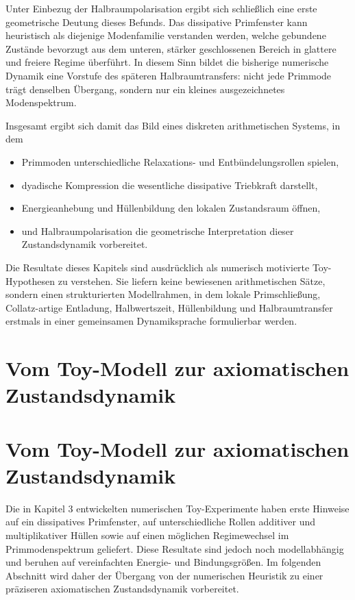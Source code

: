 \documentclass[11pt,a4paper]{article}
\theoremstyle{definition}
\begin{document}
Unter Einbezug der Halbraumpolarisation ergibt sich schließlich eine erste geometrische Deutung dieses Befunds. Das dissipative Primfenster kann heuristisch als diejenige Modenfamilie verstanden werden, welche gebundene Zustände bevorzugt aus dem unteren, stärker geschlossenen Bereich in glattere und freiere Regime überführt. In diesem Sinn bildet die bisherige numerische Dynamik eine Vorstufe des späteren Halbraumtransfers: nicht jede Primmode trägt denselben Übergang, sondern nur ein kleines ausgezeichnetes Modenspektrum.

Insgesamt ergibt sich damit das Bild eines diskreten arithmetischen Systems, in dem
\begin{itemize}
	\item Primmoden unterschiedliche Relaxations- und Entbündelungsrollen spielen,
	\item dyadische Kompression die wesentliche dissipative Triebkraft darstellt,
	\item Energieanhebung und Hüllenbildung den lokalen Zustandsraum öffnen,
	\item und Halbraumpolarisation die geometrische Interpretation dieser Zustandsdynamik vorbereitet.
\end{itemize}

Die Resultate dieses Kapitels sind ausdrücklich als numerisch motivierte Toy-Hypothesen zu verstehen. Sie liefern keine bewiesenen arithmetischen Sätze, sondern einen strukturierten Modellrahmen, in dem lokale Primschließung, Collatz-artige Entladung, Halbwertszeit, Hüllenbildung und Halbraumtransfer erstmals in einer gemeinsamen Dynamiksprache formulierbar werden.
\section{Vom Toy-Modell zur axiomatischen Zustandsdynamik}
\section{Vom Toy-Modell zur axiomatischen Zustandsdynamik}

Die in Kapitel 3 entwickelten numerischen Toy-Experimente haben erste Hinweise auf ein dissipatives Primfenster, auf unterschiedliche Rollen additiver und multiplikativer Hüllen sowie auf einen möglichen Regimewechsel im Primmodenspektrum geliefert. Diese Resultate sind jedoch noch modellabhängig und beruhen auf vereinfachten Energie- und Bindungsgrößen. Im folgenden Abschnitt wird daher der Übergang von der numerischen Heuristik zu einer präziseren axiomatischen Zustandsdynamik vorbereitet.
\end{document}

